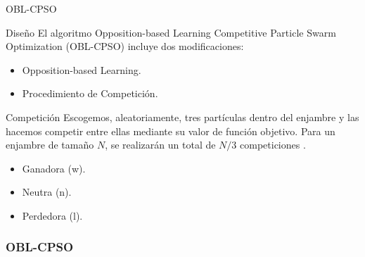 \begin{frame}{OBL-CPSO}
\begin{block}{Diseño}
El algoritmo Opposition-based Learning Competitive Particle Swarm Optimization (OBL-CPSO) \cite{oblcpso} incluye dos modificaciones:
\begin{itemize}
	\item Opposition-based Learning.
	\item Procedimiento de Competición.
\end{itemize}
\end{block}

\begin{block}{Competición}
Escogemos, aleatoriamente, tres partículas dentro del enjambre y las hacemos competir entre ellas mediante su valor de función objetivo. 
Para un enjambre de tamaño $N$, se realizarán un total de $N/3$ competiciones \cite{oblcpso}.
\begin{itemize}
  \Fontvi
  \item Ganadora (w).
  \item Neutra (n).
  \item Perdedora (l).
\end{itemize}
\end{block}
\end{frame}

\begin{frame}
\frametitle{OBL-CPSO}
\centering
\end{frame}


